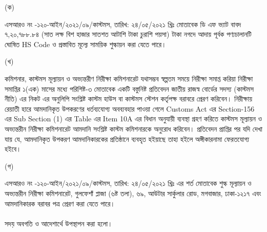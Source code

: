 \documentclass[12pt]{article}
\newcommand{\srooot}{এসআরও নং -১২০-আইন/২০২১/০৯/কাস্টমস}
\newcommand{\sroootd}{তারিখ: ২৪/০৫/২০২১ খ্রিঃ}
\begin{document}
\begin{minipage}[t]{0.05\linewidth}
\hspace{1em}
\end{minipage}
\begin{minipage}[t]{0.05\linewidth}
(ক)
\end{minipage}
\begin{minipage}[t]{0.90\linewidth}
{\srooot}, {\sroootd} মোতাবেক
ডি এফ ভ্যাট বাবদ ৭,২০,৭৮৮.৮৪ (সাত লক্ষ বিশ হাজার সাতশত আটাশি টাকা চুরাশি পয়সা) টাকা নগদে
আদায় পূর্বক পণ্যচালানটি ঘোষিত HS Code
ও প্রস্তাবিত মূল্যে সাময়িক শুল্কায়ন করা যেতে
পারে।
\end{minipage}
\begin{minipage}[t]{0.05\linewidth}
\hspace{1em}
\end{minipage}
\begin{minipage}[t]{0.05\linewidth}
(খ)
\end{minipage}
\begin{minipage}[t]{0.90\linewidth}
কমিশনার, কাস্টমস মূল্যায়ন ও অভ্যন্তরীণ
নিরীক্ষা কমিশনারেট যথাসম্ভব স্বল্পতম সময়ে
নিরীক্ষা সমাপ্ত করিয়া নিরীক্ষা সমাপ্তির
১(এক) মাসের মধ্যে পরিশিষ্ট-৩ মোতাবেক একটি
বস্তুনিষ্ট প্রতিবেদন জাতীয় রাজস্ব বোর্ডের
সদস্য (কাস্টমস নীতি) এর নিকট এর অনুলিপি সংশ্লিষ্ট
কাস্টম হাউস বা কাস্টমস স্টেশন কর্তৃপক্ষ
বরাবরে প্রেরণ করিবেন।
নিরীক্ষায় রেয়াতী হারে আমদানিকৃত উপকরণের
ধর্তব্যযোগ্য অবব্যবহার পাওয়া গেলে
Customs Act এর Section-156
এর Sub Section (1) এর Table এর Item 10A
এর বিধান অনুযায়ী ব্যবস্থা গ্রহণ করিতে কাস্টমস
মূল্যায়ন ও অভ্যন্তরীন নিরীক্ষা কমিশনারেট আমদানি
সংশ্লিষ্ট কাস্টম কমিশনারকে অনুরোধ করিবেন।
প্রতিবেদন প্রাপ্তির পর যদি দেখা যায় যে, আমদানিকৃত
উপকরণ আমদানিকারকের প্রতিষ্ঠানে ব্যবহৃত হইয়াছে তাহা
হইলে অঙ্গীকারনামা ফেরতযোগ্য হইবে।
\end{minipage}
\begin{minipage}[t]{0.05\linewidth}
\hspace{1em}
\end{minipage}
\begin{minipage}[t]{0.05\linewidth}
(গ)
\end{minipage}
\begin{minipage}[t]{0.90\linewidth}
{\srooot}, {\sroootd} এর শর্ত মোতাবেক
শুল্ক মূল্যায়ন ও অভ্যন্তরীন নিরীক্ষা কমিশনারেট,
গুলফেশাঁ প্লাজা (৬ষ্ট তলা), ৬৯, আউটার
সার্কুলার রোড, মগবাজার, ঢাকা-১২১৭ এবং
আমদানিকারক বরাবর পত্র প্রেরণ করা যেতে পারে।
\\
\\
সদয় অবগতি ও আদেশার্থে উপস্থাপন করা
হলো।
\end{minipage}
\end{document}

